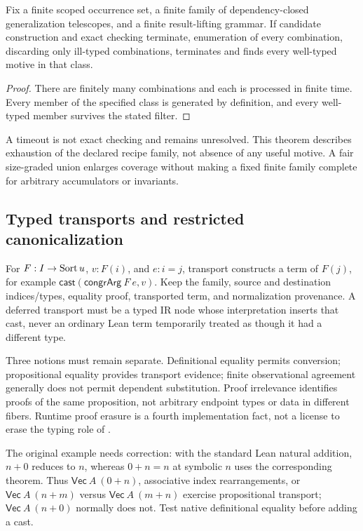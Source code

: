 \begin{proposition}\label{prop:dependent-motives}
Fix a finite scoped occurrence set, a finite family of dependency-closed
generalization telescopes, and a finite result-lifting grammar. If candidate
construction and exact checking terminate, enumeration of every combination,
discarding only ill-typed combinations, terminates and finds every well-typed
motive in that class.
\end{proposition}
\begin{proof}
There are finitely many combinations and each is processed in finite time.
Every member of the specified class is generated by definition, and every
well-typed member survives the stated filter.
\end{proof}
A timeout is not exact checking and remains unresolved. This theorem describes
exhaustion of the declared recipe family, not absence of any useful motive.
A fair size-graded union enlarges coverage without making a fixed finite family
complete for arbitrary accumulators or invariants.

\subsection{Typed transports and restricted canonicalization}\label{sec:dependent-transports}

For $F:I\to\mathrm{Sort}\,u$, $v:F(i)$, and $e:i=j$, transport constructs a term of
$F(j)$, for example $\mathsf{cast}(\mathsf{congrArg}\ F\ e,v)$. Keep the family,
source and destination indices/types, equality proof, transported term, and
normalization provenance. A deferred transport must be a typed IR node whose
interpretation inserts that cast, never an ordinary Lean term temporarily
treated as though it had a different type.

Three notions must remain separate. Definitional equality permits conversion;
propositional equality provides transport evidence; finite observational
agreement generally does not permit dependent substitution. Proof irrelevance
identifies proofs of the same proposition, not arbitrary endpoint types or
data in different fibers. Runtime proof erasure is a fourth implementation
fact, not a license to erase the typing role of .

The original example needs correction: with the standard Lean natural addition,
$n+0$ reduces to $n$, whereas $0+n=n$ at symbolic $n$ uses the corresponding
theorem. Thus $\mathsf{Vec}\ A\ (0+n)$, associative index rearrangements, or
$\mathsf{Vec}\ A\ (n+m)$ versus $\mathsf{Vec}\ A\ (m+n)$ exercise propositional
transport; $\mathsf{Vec}\ A\ (n+0)$ normally does not.\cite{leannat}
Test native definitional equality before adding a cast.

